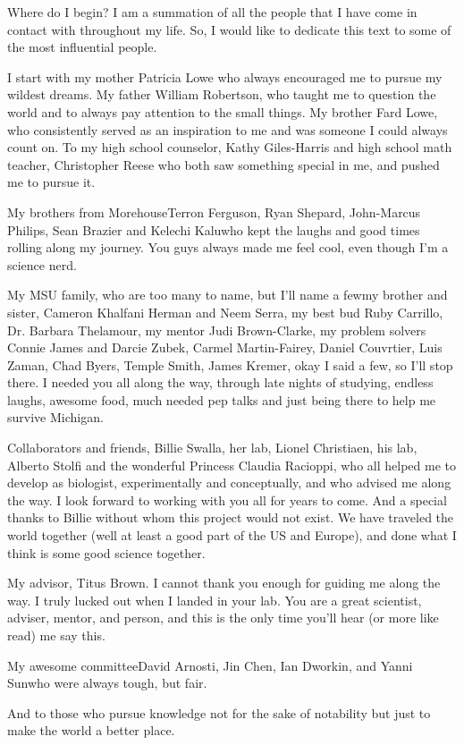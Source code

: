 Where do I begin? I am a summation of all the people that I have come in contact with throughout my life. So, I would like to dedicate this text to some of the most influential people. 

I start with my mother Patricia Lowe who always encouraged me to pursue my wildest dreams. My father William Robertson, who taught me to question the world and to always pay attention to the small things. My brother Fard Lowe, who consistently served as an inspiration to me and was someone I could always count on. To my high school counselor, Kathy Giles-Harris and high school math teacher, Christopher Reese who both saw something special in me, and pushed me to pursue it. 

My brothers from Morehouse\textemdash Terron Ferguson, Ryan Shepard, John-Marcus Philips, Sean Brazier and Kelechi Kalu\textemdash who kept the laughs and good times rolling along my journey. You guys always made me feel cool, even though I'm a science nerd.
  
My MSU family, who are too many to name, but I'll name a few\textemdash my brother and sister, Cameron Khalfani Herman and Neem Serra, my best bud Ruby Carrillo, Dr. Barbara Thelamour, my mentor Judi Brown-Clarke, my problem solvers Connie James and Darcie Zubek, Carmel Martin-Fairey, Daniel Couvrtier, Luis Zaman, Chad Byers, Temple Smith, James Kremer, okay I said a few, so I'll stop there. I needed you all along the way, through late nights of studying, endless laughs, awesome food, much needed pep talks and just being there to help me survive Michigan.

Collaborators and friends, Billie Swalla, her lab, Lionel Christiaen, his lab, Alberto Stolfi and the wonderful Princess Claudia Racioppi, who all helped me to develop as biologist, experimentally and conceptually, and who advised me along the way. I look forward to working with you all for years to come. And a special thanks to Billie without whom this project would not exist. We have traveled the world together (well at least a good part of the US and Europe), and done what I think is some good science together.

My advisor, Titus Brown. I cannot thank you enough for guiding me along the way. I truly lucked out when I landed in your lab. You are a great scientist, adviser, mentor, and person, and this is the only time you'll hear (or more like read) me say this.

My awesome committee\textemdash David Arnosti, Jin Chen, Ian Dworkin, and Yanni Sun\textemdash who were always tough, but fair.

And to those who pursue knowledge not for the sake of notability but just to make the world a better place.
